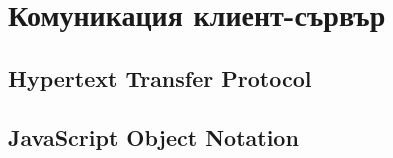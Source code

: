 \newpage
\chapter{Комуникация клиент-сървър}
\label{chapter06}

\section{Hypertext Transfer Protocol}

\section{JavaScript Object Notation}
